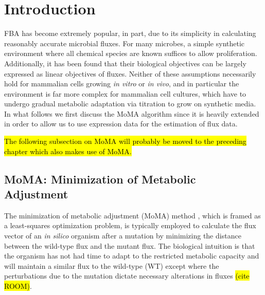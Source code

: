 \section{Introduction}

%
%
FBA has become extremely popular, in part, due to its simplicity in
calculating reasonably accurate microbial fluxes. For many microbes, a
simple synthetic environment where all chemical species are known
suffices to allow proliferation. Additionally, it has been found that
their biological objectives can be largely expressed as linear
objectives of fluxes.  Neither of these assumptions necessarily hold
for mammalian cells growing \emph{in vitro} or \emph{in vivo}, and in
particular the environment is far more complex for mammalian cell
cultures, which have to undergo gradual metabolic adaptation via
titration to grow on synthetic media. In what follows we first discuss
the MoMA algorithm since it is heavily extended in order to allow us
to use expression data for the estimation of flux data.

\hl{The following subsection on MoMA will probably be moved to the
preceding chapter which also makes use of MoMA.}

\subsection{MoMA: Minimization of Metabolic Adjustment}

The minimization of metabolic adjustment (MoMA) method
\cite{Segre2002}, which is framed as a least-squares optimization
problem, is typically employed to calculate the flux vector of an
\emph{in silico} organism after a mutation by minimizing the distance
between the wild-type flux and the mutant flux. The biological
intuition is that the organism has not had time to adapt to the
restricted metabolic capacity and will maintain a similar flux to the
wild-type (WT) except where the perturbations due to the mutation
dictate necessary alterations in fluxes \hl{(cite ROOM)}.

